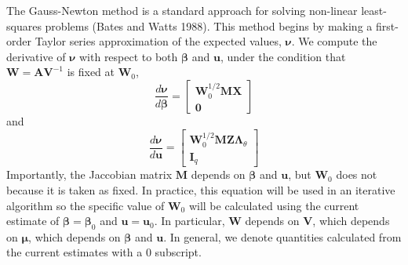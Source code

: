 \documentclass{jss}
\begin{document}
The Gauss-Newton method is a standard approach for solving non-linear
least-squares problems (Bates and Watts 1988). This method begins by
making a first-order Taylor series approximation of the expected
values, $\bm\nu$. We compute the derivative of $\bm\nu$ with respect
to both $\bm\beta$ and $\bm u$, under the condition that $\bm W = \bm
A \bm V^{-1}$ is fixed at $\bm W_0$,
\begin{displaymath}
  \frac{d \bm\nu}{d \bm\beta} = 
  \begin{bmatrix}
\bm W_0^{1/2}\bm M \bm X \\
\bm 0
\end{bmatrix}
\end{displaymath}
and 
\begin{displaymath}
\frac{d \bm\nu}{d \bm u} = 
\begin{bmatrix}
\bm W_0^{1/2}\bm M \bm Z \bm\Lambda_\theta \\
\bm I_q
\end{bmatrix}
\end{displaymath}
Importantly, the Jaccobian matrix $\bm M$ depends on $\bm\beta$ and
$\bm u$, but $\bm W_0$ does not because it is taken as
fixed. In practice, this equation will be used in an iterative
algorithm so the specific value of $\bm W_0$ will be calculated
using the current estimate of $\bm\beta = \bm\beta_0$ and $\bm u  =
\bm u_0$. In particular, $\bm W$ depends on $\bm V$, which depends on
$\bm\mu$, which depends on $\bm\beta$ and $\bm u$. In general, we
denote quantities calculated from the current estimates with a $0$
subscript.
\end{document}
